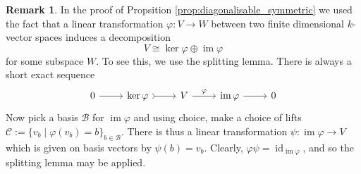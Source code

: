 \documentclass[12pt]{article}
\theoremstyle{plain}
\theoremstyle{definition}
\newtheorem{remark}[thm]{Remark}
\newcommand{\scr}[1]{\mathscr{#1}}
\newcommand{\lto}{\longrightarrow}
\begin{document}
\begin{remark}
	In the proof of Propsition \ref{prop:diagonalisable_symmetric} we used the fact that a linear transformation $\varphi: V \lto W$ between two finite dimensional $k$-vector spaces induces a decomposition
	\begin{equation}
		V \cong \operatorname{ker}\varphi \oplus \operatorname{im}\varphi
		\end{equation}
	for some subspace $W$. To see this, we use the splitting lemma. There is always a short exact sequence
	\begin{equation}
		\begin{tikzcd}
			0\arrow[r] & \operatorname{ker}\varphi\arrow[r,rightarrowtail] & V\arrow[r,"{\varphi}"] & \operatorname{im}\varphi\arrow[r] & 0
			\end{tikzcd}
		\end{equation}
	Now pick a basis $\scr{B}$ for $\operatorname{im}\varphi$ and using choice, make a choice of lifts $\scr{C} := \{ v_b \mid \varphi(v_b) = b \}_{b \in \scr{B}}$. There is thus a linear transformation $\psi: \operatorname{im}\varphi \lto V$ which is given on basis vectors by $\psi(b) = v_b$. Clearly, $\varphi \psi = \operatorname{id}_{\operatorname{im}\varphi}$, and so the splitting lemma may be applied.
	\end{remark}
\end{document}
